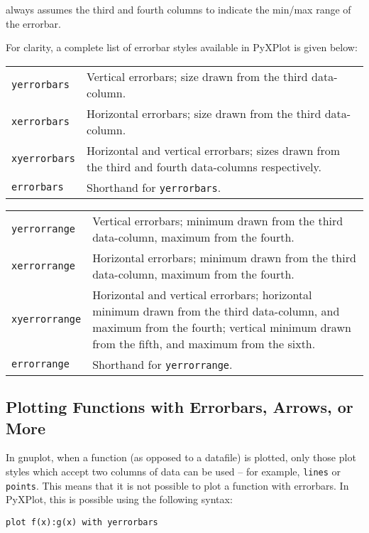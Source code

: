 \noindent always assumes the third and fourth columns to indicate the min/max
range of the errorbar.

\vspace{0.5cm}
For clarity, a complete list of errorbar styles available in PyXPlot is given below:

\begin{tabular}{p{2.5cm}p{7.5cm}}
\texttt{yerrorbars} & Vertical errorbars; size drawn from the third data-column. \\
\texttt{xerrorbars} & Horizontal errorbars; size drawn from the third data-column. \\
\texttt{xyerrorbars} & Horizontal and vertical errorbars; sizes drawn from the third and fourth data-columns respectively.\\
\texttt{errorbars} & Shorthand for \texttt{yerrorbars}. \\
\end{tabular}

\begin{tabular}{p{2.5cm}p{7.5cm}}
\texttt{yerrorrange} & Vertical errorbars; minimum drawn from the third data-column, maximum from the fourth.\\
\texttt{xerrorrange} & Horizontal errorbars; minimum drawn from the third data-column, maximum from the fourth.\\
\texttt{xyerrorrange} & Horizontal and vertical errorbars; horizontal minimum drawn from the third data-column, and maximum from the fourth; vertical minimum drawn from the fifth, and maximum from the sixth.\\
\texttt{errorrange} & Shorthand for \texttt{yerrorrange}. \\
\end{tabular}

\subsection{Plotting Functions with Errorbars, Arrows, or More}

In gnuplot, when a function (as opposed to a datafile) is plotted, only those
plot styles which accept two columns of data can be used -- for example,
\texttt{lines} or \texttt{points}. This means that it is not possible to plot a
function with errorbars. In PyXPlot, this is possible using the following
syntax:

\begin{verbatim}
plot f(x):g(x) with yerrorbars
\end{verbatim}

